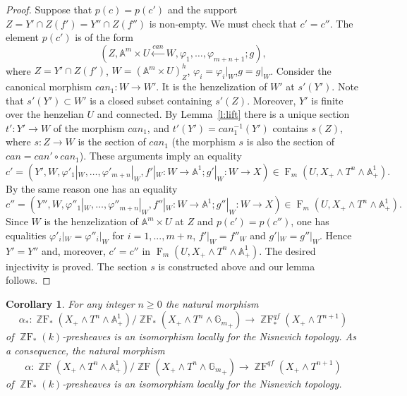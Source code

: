 \documentclass[a4paper,11pt,reqno]{amsart}
\newtheorem{corollary}[theorem]{Corollary}
\begin{document}
\begin{proof}
Suppose that $p(c)=p(c')$ and the support $Z=Y'\cap Z(f')=Y''\cap
Z(f'')$ is non-empty. We must check that $c'=c''$. The element
$p(c')$ is of the form
   $$(Z,{\mathbb{A}}^m\times U\xleftarrow{can} W,{\varphi}_1,\ldots,{\varphi}_{m+n+1};g),$$
where $Z=Y'\cap Z(f')$, $W=({\mathbb{A}}^m\times U)^h_Z$,
${\varphi}_{i}={\varphi}_i|_{W}$,$g=g|_W$. Consider the canonical morphism
$can_1: W\to W'$. It is the henzelization of $W'$ at $s'(Y')$. Note
that $s'(Y')\subset W'$ is a closed subset containing $s'(Z)$.
Moreover, $Y'$ is finite over the henzelian $U$ and connected. By
Lemma~\ref{l:lift} there is a unique section $t':Y'\to W$ of the
morphism $can_1$, and $t'(Y')=can^{-1}_1(Y')$ contains $s(Z)$, where
$s:Z\to W$ is the section of $can_1$ (the morphism $s$ is also the
section of $can=can'\circ can_1$). These arguments imply an equality
   $$c'=(Y',W,{\varphi}'_1|_W,\ldots,{\varphi}'_{m+n}|_W,f'|_W:W\to {\mathbb{A}}^1;g'|_W:W\to X) \in {\operatorname{F}}_m(U,X_+\wedge T^{n}\wedge {\mathbb{A}}^1_+).$$
By the same reason one has an equality
   $$c''=(Y'',W,{\varphi}''_1|_W,\ldots,{\varphi}''_{m+n}|_W,f''|_W:W\to {\mathbb{A}}^1;g''|_W:W\to X) \in {\operatorname{F}}_m(U,X_+\wedge T^{n}\wedge {\mathbb{A}}^1_+).$$
Since $W$ is the henzelization of ${\mathbb{A}}^m\times U$ at $Z$ and
$p(c')=p(c'')$, one has equalities ${\varphi}'_i|_W={\varphi}''_i|_W$ for
$i=1,...,m+n$, $f'|_W=f''_W$ and $g'|_W=g''|_W$. Hence $Y'=Y''$ and,
moreover, $c'=c''$ in ${\operatorname{F}}_m(U,X_+\wedge T^{n}\wedge {\mathbb{A}}^1_+)$. The
desired injectivity is proved. The section $s$ is constructed above
and our lemma follows.
\end{proof}

\begin{corollary}
\label{cor:pushout}
For any integer $n{\geqslant} 0$ the natural morphism
$$\alpha_*: {\operatorname{\mathbb{Z}F}}_*(X_+\wedge T^n \wedge {\mathbb{A}}^1_+)/{\operatorname{\mathbb{Z}F}}_*(X_+\wedge T^n \wedge {{\mathbb{G}_m}}_+)\to {\operatorname{\mathbb{Z}F}}^{qf}_*(X_+\wedge T^{n+1})$$
of ${\operatorname{\mathbb{Z}F}}_*(k)$-presheaves is an isomorphism locally for the Nisnevich
topology. As a consequence, the natural morphism
   $$\alpha: {\operatorname{\mathbb{Z}F}}(X_+\wedge T^n \wedge {\mathbb{A}}^1_+)/{\operatorname{\mathbb{Z}F}}(X_+\wedge T^n \wedge {{\mathbb{G}_m}}_+)\to {\operatorname{\mathbb{Z}F}}^{qf}(X_+\wedge T^{n+1})$$
of ${\operatorname{\mathbb{Z}F}}_*(k)$-presheaves is an isomorphism locally for the Nisnevich topology.
\end{corollary}
\end{document}
